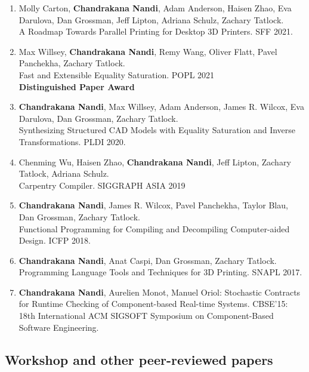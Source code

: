 \documentclass[margin, 10pt]{res} %
\begin{document}
\begin{resume}
\begin{enumerate}
\item Molly Carton, \textbf{Chandrakana Nandi}, Adam Anderson, Haisen Zhao, Eva Darulova, Dan Grossman, Jeff Lipton, Adriana Schulz, Zachary Tatlock. \\
  A Roadmap Towards Parallel Printing for Desktop 3D Printers. SFF 2021.

\item Max Willsey, \textbf{Chandrakana Nandi}, Remy Wang, Oliver Flatt, Pavel Panchekha, Zachary Tatlock. \\
    Fast and Extensible Equality Saturation. POPL 2021 \\
    \textbf{Distinguished Paper Award}

  \item \textbf{Chandrakana Nandi}, Max Willsey, Adam Anderson, James R. Wilcox, Eva Darulova, Dan Grossman, Zachary Tatlock. \\
    Synthesizing Structured CAD Models with Equality Saturation and Inverse Transformations. PLDI 2020.
  \item Chenming Wu, Haisen Zhao, \textbf{Chandrakana Nandi}, Jeff Lipton, Zachary Tatlock, Adriana Schulz. \\
    Carpentry Compiler. SIGGRAPH ASIA 2019

  \item \textbf{Chandrakana Nandi}, James R. Wilcox, Pavel Panchekha, Taylor Blau, Dan Grossman, Zachary Tatlock. \\
    Functional Programming for Compiling and Decompiling Computer-aided Design. ICFP 2018.
  \item \textbf{Chandrakana Nandi}, Anat Caspi, Dan Grossman, Zachary Tatlock. \\
    Programming Language Tools and Techniques for 3D Printing. SNAPL 2017.

\item \textbf{Chandrakana Nandi}, Aurelien Monot, Manuel Oriol: Stochastic Contracts for Runtime Checking of Component-based Real-time Systems. CBSE'15: 18th International ACM SIGSOFT Symposium on Component-Based Software Engineering.
\end{enumerate}


\subsection{Workshop and other peer-reviewed papers}


\end{resume}
\end{document}

